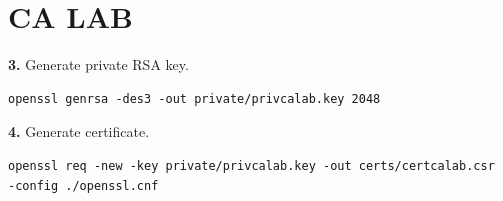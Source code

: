 \documentclass[12pt]{extarticle}
\begin{document}
\section{CA LAB}
\textbf{3.} Generate private RSA key.
\begin{verbatim}
openssl genrsa -des3 -out private/privcalab.key 2048
\end{verbatim}

\textbf{4.} Generate certificate.
\begin{verbatim}
openssl req -new -key private/privcalab.key -out certs/certcalab.csr
-config ./openssl.cnf
\end{verbatim}
\end{document}
